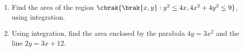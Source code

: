 \begin{enumerate}
\item Find the area of the region $\cbrak{\brak{x,y} : y^2 \leq 4x, 4x^2+4y^2 \leq 9}$, using integration.

\item Using integration, find the area enclosed by the parabola $4y = 3x^2$ and the line $2y = 3x+12$. 
\end{enumerate}
